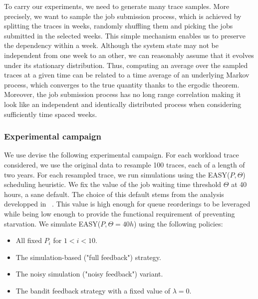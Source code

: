 \documentclass[sigconf,review]{acmart}
\begin{document}

To carry our experiments, we need to generate many trace samples. More
precisely, we want to sample the job submission process, which is achieved by
splitting the traces in weeks, randomly shuffling them and picking the jobs
submitted in the selected weeks.  This simple mechanism enables us to preserve
the dependency within a week. Although the system state may not be independent
from one week to an other, we can reasonably assume that it evolves under its
stationary distribution. Thus, computing an average over the sampled traces at
a given time can be related to a time average of an underlying Markov process,
which converges to the true quantity thanks to the ergodic theorem.  Moreover,
the job submission process has no long range correlation making it look like an
independent and identically distributed process when considering sufficiently
time spaced weeks.

\subsubsection{Experimental campaign}

We use devise the following experimental campaign. For each workload trace
considered, we use the original data to resample 100 traces, each of a length
of two years. For each resampled trace, we run simulations using the
EASY($P,\Theta$) scheduling heuristic. We fix the value of the job waiting time
threshold $\Theta$ at 40 hours, a sane default. The choice of this default
stems from the analysis developped in ~\cite{jsspp17}. This value is high
enough for queue reorderings to be leveraged while being low enough to provide
the functional requirement of preventing starvation. We simulate
EASY($P,\Theta=40h$) using the following policies:

\begin{itemize}
  \item All fixed $P_i$ for $1<i<10$.
  \item The simulation-based ("full feedback") strategy.
  \item The noisy simulation ("noisy feedback") variant.
  \item The bandit feedback strategy with a fixed value of $\lambda=0$.
\end{itemize}
\end{document}
